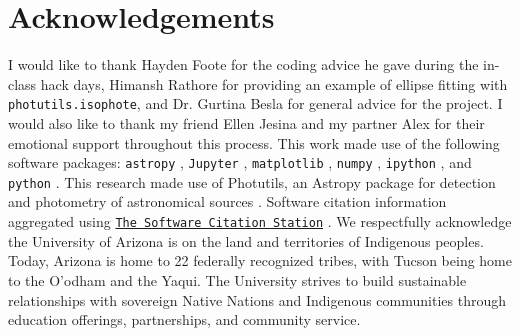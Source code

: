 \documentclass[twocolumn]{aastex631}
\begin{document}
\section{Acknowledgements}
I would like to thank Hayden Foote for the coding advice he gave during the in-class hack days, Himansh Rathore for providing an example of ellipse fitting with \texttt{photutils.isophote}, and Dr. Gurtina Besla for general advice for the project.
I would also like to thank my friend Ellen Jesina and my partner Alex for their emotional support throughout this process.
This work made use of the following software packages: \texttt{astropy} \citep{astropy:2013, astropy:2018, astropy:2022}, \texttt{Jupyter} \citep{2007CSE.....9c..21P, kluyver2016jupyter}, \texttt{matplotlib} \citep{Hunter:2007}, \texttt{numpy} \citep{numpy}, \texttt{ipython} \citep{ipython}, and \texttt{python} \citep{python}.
This research made use of Photutils, an Astropy package for detection and photometry of astronomical sources \citep{Photutils_8248020}.
Software citation information aggregated using \texttt{\href{https://www.tomwagg.com/software-citation-station/}{The Software Citation Station}} \citep{software-citation-station-paper, software-citation-station-zenodo}.
We respectfully acknowledge the University of Arizona is on the land and territories of Indigenous peoples. Today, Arizona is home to 22 federally recognized tribes, with Tucson being
home to the O’odham and the Yaqui. The University strives to build sustainable relationships with sovereign Native Nations and Indigenous communities through education offerings,
partnerships, and community service.



{}

\end{document}
